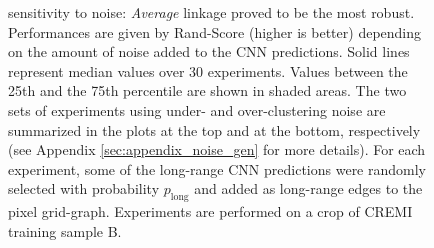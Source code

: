\begin{figure}[t]
\caption{\algname{} sensitivity to noise: \emph{Average} linkage proved to be the most robust. Performances are given by Rand-Score (higher is better) depending on the amount of noise added to the CNN predictions. Solid lines represent median values over 30 experiments. Values between the 25th and the 75th percentile are shown in shaded areas. The two sets of experiments using under- and over-clustering noise are summarized in the plots at the top and at the bottom, respectively (see Appendix \ref{sec:appendix_noise_gen} for more details). For each experiment, some of the long-range CNN predictions were randomly selected with probability $p_{\mathrm{long}}$ and added as long-range edges to the pixel grid-graph. Experiments are performed on a crop of CREMI training sample B.
}\label{fig:noise_plots}
\end{figure}
